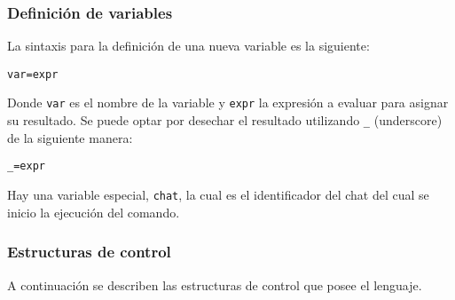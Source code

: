 \documentclass[12pt,a4paper,final]{article}
\begin{document}
\subsubsection{Definición de variables}
La sintaxis para la definición de una nueva variable es la siguiente:

\begin{alltt}
var = expr
\end{alltt}

Donde \texttt{var} es el nombre de la variable y \texttt{expr} la expresión a evaluar para asignar su resultado.
Se puede optar por desechar el resultado utilizando \texttt{\_} (underscore) de la siguiente manera:

\begin{alltt}
_ = expr
\end{alltt}

Hay una variable especial, \texttt{chat}, la cual es el identificador del chat del cual se inicio la ejecución del comando.

\subsubsection{Estructuras de control}
A continuación se describen las estructuras de control que posee el lenguaje.
\end{document}
